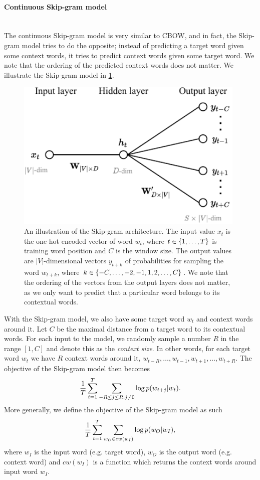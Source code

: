 \paragraph*{Continuous Skip-gram model}\mbox{} \\
The continuous Skip-gram model is very similar to CBOW, and in fact, the Skip-gram model tries to do the opposite; instead of predicting a target word given some context words, it tries to predict context words given some target word. We note that the ordering of the predicted context words does not matter. We illustrate the Skip-gram model in \cref{fig:skip-gram-model}.
\begin{figure}[H]
    \centering
    \includegraphics[width=11cm]{thesis/figures/skim-gram_cropped.pdf}
    \caption{An illustration of the Skip-gram architecture. The input value $x_t$ is the one-hot encoded vector of word $w_t$, where $t \in \left\{1, \ldots, T\right\}$ is training word position and $C$ is the window size. The output values are $|V|$-dimensional vectors $y_{t+k}$ of probabilities for sampling the word $w_{t+k}$, where $k \in \left\{-C, \ldots, -2, -1, 1, 2, \ldots, C\right\}$. We note that the ordering of the vectors from the output layers does not matter, as we only want to predict that a particular word belongs to its contextual words.}
    \label{fig:skip-gram-model}
\end{figure}

With the Skip-gram model, we also have some target word $w_t$ and context words around it. Let $C$ be the maximal distance from a target word to its contextual words. For each input to the model, we randomly sample a number $R$ in the range $[1, C]$ and denote this as the \textit{context size}. In other words, for each target word $w_t$ we have $R$ context words around it, $w_{t-R}, \ldots, w_{t-1}, w_{t+1}, \ldots, w_{t+R}$. The objective of the Skip-gram model then becomes
\begin{align}
    \frac{1}{T} \sum\limits_{t=1}^{T} \sum\limits_{-R \leq j \leq R, j \neq 0}^{} \log p(w_{t+j} | w_t).
    \label{eqn:skip-gram-objective-function}
\end{align}
More generally, we define the objective of the Skip-gram model as such
\begin{align}
    \frac{1}{T} \sum\limits_{t=1}^{T} \sum\limits_{w_O \in cw(w_I)}^{} \log p(w_O | w_I),
    \label{eqn:skip-gram-objective-function-general}
\end{align}
where $w_I$ is the input word (e.g. target word), $w_O$ is the output word (e.g. context word) and $cw(w_I)$ is a function which returns the context words around input word $w_I$.

